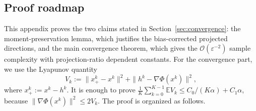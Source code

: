 \documentclass{pkumelon}
\theoremstyle{plain}
\newcommand{\E}{\mathbb{E}}
\newcommand{\Phiobj}{\Phi}
\begin{document}
\subsection{Proof roadmap}
This appendix proves the two claims stated in Section~\ref{sec:convergence}: the moment-preservation lemma, which justifies the bias-corrected projected directions, and the main convergence theorem, which gives the $\mathcal O(\varepsilon^{-2})$ sample complexity with projection-ratio dependent constants. For the convergence part, we use the Lyapunov quantity
\begin{equation*}
V_k:=\|x_+^k-x^k\|^2+\|h^k-\nabla\Phiobj(x^k)\|^2,
\end{equation*}
where $x_+^k:=x^k-h^k$. It is enough to prove $\frac{1}{K}\sum_{k=0}^{K-1}\E V_k\le C_0/(K\alpha)+C_1\alpha$, because $\|\nabla\Phiobj(x^k)\|^2\le 2V_k$. The proof is organized as follows.
\end{document}
